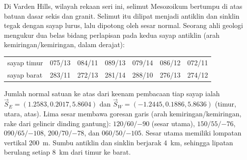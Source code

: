 \begin{problem}
\label{pb:b3:structural-analysis:1}
Di Varden Hills, wilayah rekaan seri ini, selimut Mesozoikum bertumpu di atas
batuan dasar sekis dan granit. Selimut itu dilipat menjadi antiklin dan sinklin tegak
dengan sayap lurus, lalu dipotong oleh sesar normal. Seorang
ahli geologi mengukur dua belas bidang perlapisan pada kedua sayap antiklin
(arah kemiringan/kemiringan, dalam derajat):

\begin{center}
\small
\begin{tabular}{l|cccccc}
\hline
sayap timur & 075/13 & 084/11 & 089/13 & 079/14 & 086/12 & 072/11 \\
sayap barat & 283/11 & 272/13 & 281/14 & 288/10 & 276/13 & 274/12 \\
\hline
\end{tabular}
\end{center}

Jumlah normal satuan ke atas dari keenam pembacaan tiap sayap ialah
$\vec S_E = (1.2583, 0.2017, 5.8604)$ dan $\vec S_W = (-1.2445, 0.1886,
5.8636)$ (timur, utara, atas). Lima sesar membawa goresan garis (arah kemiringan/kemiringan,
rake dari gelincir dinding gantung): $120/60/{-90}$ (sesar utama), $150/55/{-76}$,
$090/65/{-108}$, $200/70/{-78}$, dan $060/50/{-105}$. Sesar utama memiliki
lompatan vertikal \qty{200}{m}. Sumbu antiklin dan sinklin berjarak \qty{4}{km},
sehingga lipatan berulang setiap \qty{8}{km} dari timur ke barat.


\end{problem}
